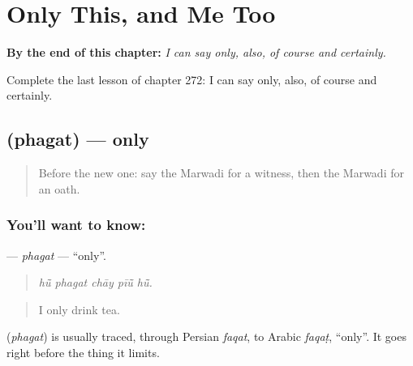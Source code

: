 
\chapter{Only This, and Me Too}
\label{ch:mw-only-this-and-me-too}

\begin{chapteropening}
\textbf{By the end of this chapter:} \emph{I can say only, also, of course and certainly.}

Complete the last lesson of chapter 272: I can say only, also, of course and certainly.
\end{chapteropening}

\section[\texorpdfstring{\mw{फगत} (phagat)}{फगत (phagat)}]{ (phagat) — only}

\label{lesson:MW-C272-phagat}



\begin{quote}
Before the new one: say the Marwadi for a witness, then the Marwadi for an oath.
\end{quote}

\subsection*{You'll want to know: }
\textbf{} — \emph{phagat} — \textquotedblleft{}only\textquotedblright{}.

\begin{quote}
    
\end{quote}

\begin{quote}
\emph{hū̃ phagat chāy pīū̃ hū̃.}
\end{quote}

\begin{quote}
I only drink tea.
\end{quote}

\begin{cousinweb}
\textbf{} (\emph{phagat}) is usually traced, through Persian \emph{faqat}, to Arabic \emph{faqaṭ}, \textquotedblleft{}only\textquotedblright{}. It goes right before the thing it limits.
\end{cousinweb}

